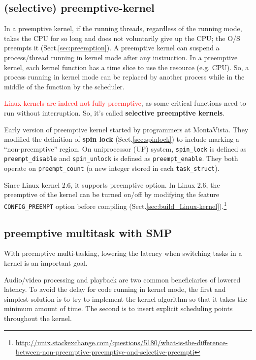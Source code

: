 \subsection{(selective) preemptive-kernel}
\label{sec:preemptive-kernel}

In a preemptive kernel, if the running threads, regardless of the running mode,
takes the CPU for so long and does not voluntarily give up the CPU; the O/S
preempts it (Sect.\ref{sec:preemption}).
A preemptive kernel can suspend a process/thread running in kernel mode after
any instruction. In a preemptive kernel, each kernel function has a time slice
to use the resource (e.g. CPU). So, a process running in kernel mode can be
replaced by another process while in the middle of the function by the
scheduler.

\textcolor{red}{Linux kernels are indeed not fully preemptive}, as some critical
functions need to run without interruption. So, it's called {\bf selective preemptive kernels}.

Early version of preemptive kernel started by programmers at MontaVista. They
modified the definition of {\bf spin lock} (Sect.\ref{sec:spinlock}) to include
marking a ``non-preemptive'' region. On uniprocessor (UP) system, \verb!spin_lock! is
defined as \verb!preempt_disable! and \verb!spin_unlock! is defined as
\verb!preempt_enable!. They both operate on \verb!preempt_count! (a new integer
stored in each \verb!task_struct!).

Since Linux kernel 2.6, it supports preemptive option. In Linux 2.6, the
preemptive of the kernel can be turned on/off by modifying the feature
\verb!CONFIG_PREEMPT! option before compiling
(Sect.\ref{sec:build_Linux-kernel}).\footnote{\url{http://unix.stackexchange.com/questions/5180/what-is-the-difference-between-non-preemptive-preemptive-and-selective-preempti}}


\subsection{preemptive multitask with SMP}

With preemptive multi-tasking, lowering the latency when switching tasks in a
kernel is an important goal. 

Audio/video processing and playback are two common beneficiaries of lowered
latency. To avoid the delay for code running in kernel mode, the first and
simplest solution is to try to implement the kernel algorithm so that it takes
the minimum amount of time. The second is to insert explicit scheduling points
throughout the kernel. %

